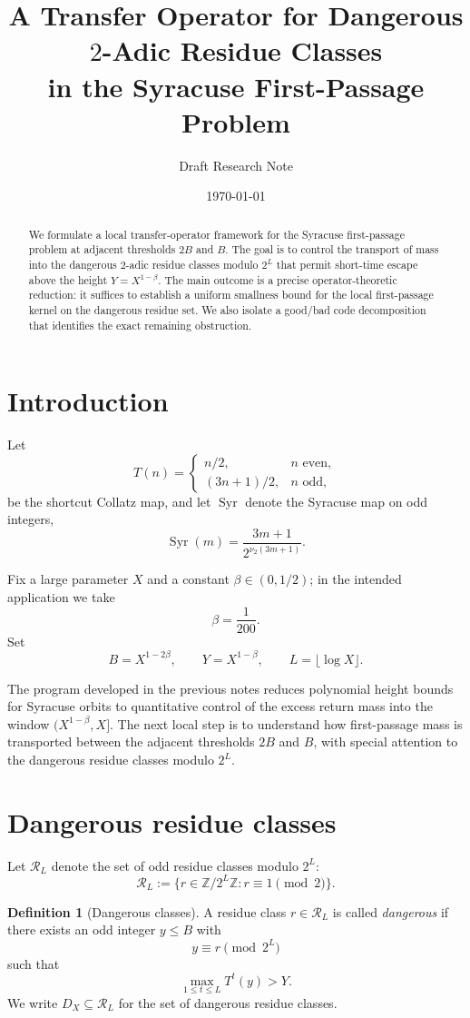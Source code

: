 \documentclass[11pt]{article}
\title{A Transfer Operator for Dangerous $2$-Adic Residue Classes\\
in the Syracuse First-Passage Problem}
\author{Draft Research Note}
\date{\today}
\theoremstyle{definition}
\newtheorem{definition}[theorem]{Definition}
\theoremstyle{remark}
\newcommand{\Z}{\mathbb{Z}}
\newcommand{\1}{\mathbf{1}}
\newcommand{\Syr}{\operatorname{Syr}}
\newcommand{\Res}{\mathcal R_L}
\newcommand{\DX}{D_X}
\begin{document}
\maketitle

\begin{abstract}
We formulate a local transfer-operator framework for the Syracuse first-passage problem at adjacent thresholds $2B$ and $B$. The goal is to control the transport of mass into the dangerous $2$-adic residue classes modulo $2^L$ that permit short-time escape above the height $Y=X^{1-\beta}$. The main outcome is a precise operator-theoretic reduction: it suffices to establish a uniform smallness bound for the local first-passage kernel on the dangerous residue set. We also isolate a good/bad code decomposition that identifies the exact remaining obstruction.
\end{abstract}

\section{Introduction}

Let
\[
T(n)=
\begin{cases}
n/2, & n \text{ even},\\
(3n+1)/2, & n \text{ odd},
\end{cases}
\]
be the shortcut Collatz map, and let $\Syr$ denote the Syracuse map on odd integers,
\[
\Syr(m)=\frac{3m+1}{2^{\nu_2(3m+1)}}.
\]

Fix a large parameter $X$ and a constant $\beta\in(0,1/2)$; in the intended application we take
\[
\beta=\frac1{200}.
\]
Set
\[
B=X^{1-2\beta},\qquad Y=X^{1-\beta},\qquad L=\lfloor \log X\rfloor.
\]

The program developed in the previous notes reduces polynomial height bounds for Syracuse orbits to quantitative control of the excess return mass into the window $(X^{1-\beta},X]$. The next local step is to understand how first-passage mass is transported between the adjacent thresholds $2B$ and $B$, with special attention to the dangerous residue classes modulo $2^L$.

\section{Dangerous residue classes}

Let $\Res$ denote the set of odd residue classes modulo $2^L$:
\[
\Res:=\{r \in \Z/2^L\Z : r \equiv 1 \pmod 2\}.
\]

\begin{definition}[Dangerous classes]
A residue class $r\in\Res$ is called \emph{dangerous} if there exists an odd integer $y\leq B$ with
\[
y\equiv r \pmod{2^L}
\]
such that
\[
\max_{1\le t\le L} T^t(y)>Y.
\]
We write $\DX\subseteq \Res$ for the set of dangerous residue classes.
\end{definition}
\end{document}
